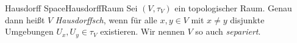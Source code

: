 \begin{mdef}{Hausdorff Space}{HausdorffRaum}
    Sei $(V,\tau_V)$ ein topologischer Raum. Genau dann heißt $V$ \emph{Hausdorffsch}, wenn für alle $x,y\in V$ mit $x\neq y$ disjunkte Umgebungen $U_x,U_y\in\tau_V$ existieren. Wir nennen $V$ so auch \emph{separiert}.
\end{mdef}